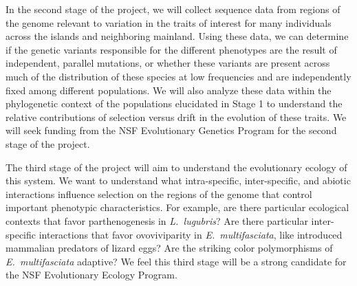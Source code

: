 In the second stage of the project, we will collect sequence data from regions
of the genome relevant to variation in the traits of interest for many
individuals across the islands and neighboring mainland.
Using these data, we can determine if the genetic variants responsible for the
different phenotypes are the result of independent, parallel mutations, or
whether these variants are present across much of the distribution of these
species at low frequencies and are independently fixed among different
populations.
We will also analyze these data within the phylogenetic context of the
populations elucidated in Stage 1 to understand the relative contributions of
selection versus drift in the evolution of these traits.
We will seek funding from the NSF Evolutionary Genetics Program for the second
stage of the project.

The third stage of the project will aim to understand the evolutionary ecology
of this system.
We want to understand what intra-specific, inter-specific, and abiotic
interactions influence selection on the regions of the genome that control
important phenotypic characteristics.
For example, are there particular ecological contexts that favor
parthenogenesis in \emph{L.\ lugubris}?
Are there particular inter-specific interactions that favor ovoviviparity in
\emph{E.\ multifasciata}, like introduced mammalian predators of lizard eggs?
Are the striking color polymorphisms of \emph{E.\ multifasciata} adaptive?
We feel this third stage will be a strong candidate for the NSF Evolutionary
Ecology Program.

